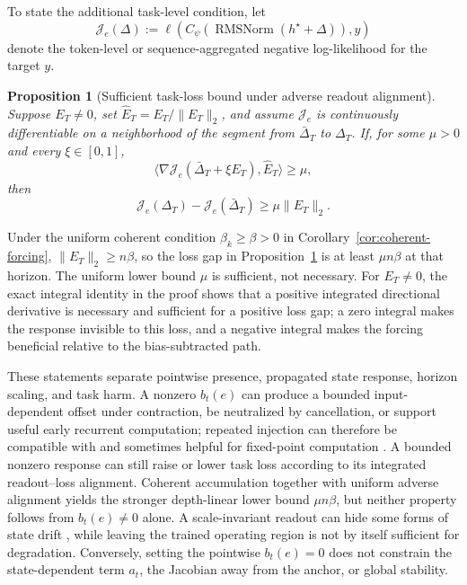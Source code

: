 \documentclass[letterpaper]{article} %
\newcommand{\norm}[1]{\lVert#1\rVert}
\newtheorem{proposition}[theorem]{Proposition}
\theoremstyle{remark}
\begin{document}
To state the additional task-level condition, let
\begin{equation}
	\mathcal J_e(\Delta)
	:=\ell(C_\psi(\operatorname{RMSNorm}(h^\star+\Delta)),y)
\end{equation}
denote the token-level or sequence-aggregated negative log-likelihood for the target $y$.

\begin{proposition}[Sufficient task-loss bound under adverse readout alignment]
	\label{prop:task-loss-forcing}
	Suppose $E_T\neq0$, set $\widehat E_T=E_T/\norm{E_T}_2$, and assume $\mathcal J_e$ is continuously differentiable on a neighborhood of the segment from $\bar\Delta_T$ to $\Delta_T$.  If, for some $\mu>0$ and every $\xi\in[0,1]$,
	\begin{equation}
		\langle
		\nabla\mathcal J_e(\bar\Delta_T+\xi E_T),\widehat E_T
		\rangle\geq\mu,
	\end{equation}
	then
	\begin{equation}
		\mathcal J_e(\Delta_T)-\mathcal J_e(\bar\Delta_T)
		\geq\mu\norm{E_T}_2.
	\end{equation}
\end{proposition}

Under the uniform coherent condition $\beta_k\geq\beta>0$ in Corollary~\ref{cor:coherent-forcing}, $\norm{E_T}_2\geq n\beta$, so the loss gap in Proposition~\ref{prop:task-loss-forcing} is at least $\mu n\beta$ at that horizon.  The uniform lower bound $\mu$ is sufficient, not necessary.  For $E_T\neq0$, the exact integral identity in the proof shows that a positive integrated directional derivative is necessary and sufficient for a positive loss gap; a zero integral makes the response invisible to this loss, and a negative integral makes the forcing beneficial relative to the bias-subtracted path.

These statements separate pointwise presence, propagated state response, horizon scaling, and task harm.  A nonzero $b_t(e)$ can produce a bounded input-dependent offset under contraction, be neutralized by cancellation, or support useful early recurrent computation; repeated injection can therefore be compatible with and sometimes helpful for fixed-point computation \citep{anil2022path,blayney2026mechanistic}.  A bounded nonzero response can still raise or lower task loss according to its integrated readout--loss alignment.  Coherent accumulation together with uniform adverse alignment yields the stronger depth-linear lower bound $\mu n\beta$, but neither property follows from $b_t(e)\neq0$ alone.  A scale-invariant readout can hide some forms of state drift \citep{sharma2026readout}, while leaving the trained operating region is not by itself sufficient for degradation.  Conversely, setting the pointwise $b_t(e)=0$ does not constrain the state-dependent term $a_t$, the Jacobian away from the anchor, or global stability.
\end{document}
